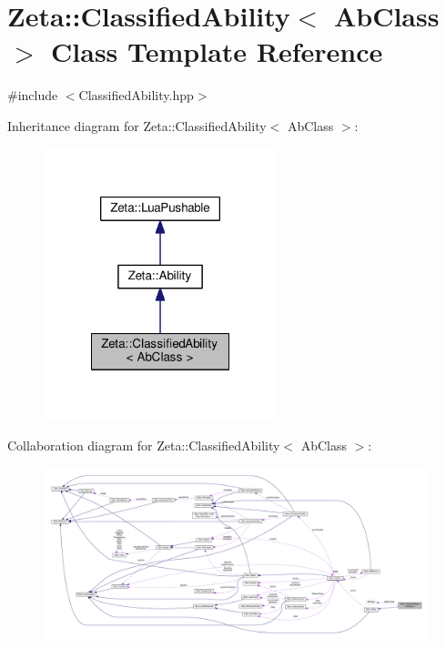\hypertarget{classZeta_1_1ClassifiedAbility}{\section{Zeta\+:\+:Classified\+Ability$<$ Ab\+Class $>$ Class Template Reference}
\label{classZeta_1_1ClassifiedAbility}
}


{\ttfamily \#include $<$Classified\+Ability.\+hpp$>$}



Inheritance diagram for Zeta\+:\+:Classified\+Ability$<$ Ab\+Class $>$\+:\nopagebreak
\begin{figure}[H]
\begin{center}
\leavevmode
\includegraphics[width=192pt]{classZeta_1_1ClassifiedAbility__inherit__graph}
\end{center}
\end{figure}


Collaboration diagram for Zeta\+:\+:Classified\+Ability$<$ Ab\+Class $>$\+:
\nopagebreak
\begin{figure}[H]
\begin{center}
\leavevmode
\includegraphics[width=350pt]{classZeta_1_1ClassifiedAbility__coll__graph}
\end{center}
\end{figure}
